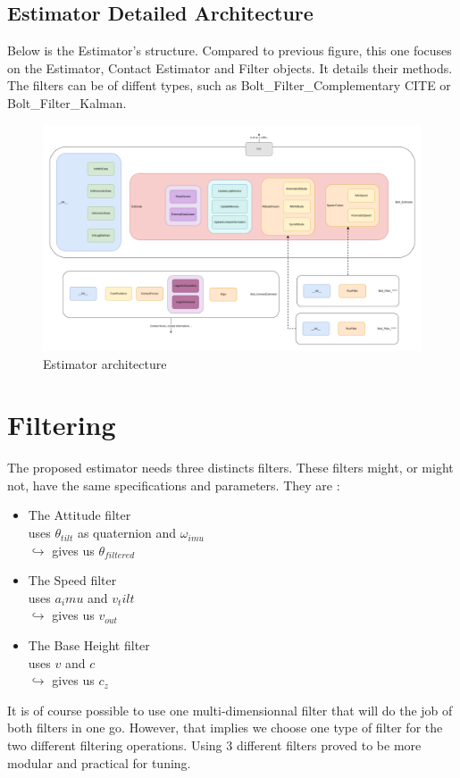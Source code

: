 \documentclass[a4paper,10pt]{article}
\begin{document}
\subsection{Estimator Detailed Architecture}
Below is the Estimator's structure. Compared to previous figure, this one focuses on the Estimator, Contact Estimator and Filter objects. It details their methods. The filters can be of diffent types, such as Bolt\_Filter\_Complementary CITE or Bolt\_Filter\_Kalman.
\begin{figure}[H]
\hspace{-2.5cm} 
  \includegraphics[width=\linewidth, angle=0, scale=1.4]{./images/BoltEstimator0_full_200.png}
  \caption{Estimator architecture}
\end{figure}


\section{Filtering}
The proposed estimator needs three distincts filters. These filters might, or might not, have the same specifications and parameters. They are :
\begin{itemize}
	\item{The Attitude filter\\
	uses $\theta_{tilt}$ as quaternion and $\omega_{imu}$\\
	$\hookrightarrow$ gives us $\theta_{filtered}$}
	\item{The Speed filter\\
	uses $a_imu$ and $v_tilt$\\
	$\hookrightarrow$ gives us $v_{out}$}
	\item{The Base Height filter\\
	uses $v$ and $c$\\
	$\hookrightarrow$ gives us $c_z$}
\end{itemize}
It is of course possible to use one multi-dimensionnal filter that will do the job of both filters in one go. However, that implies we choose one type of filter for the two different filtering operations. Using 3 different filters proved to be more modular and practical for tuning. \\
\end{document}
